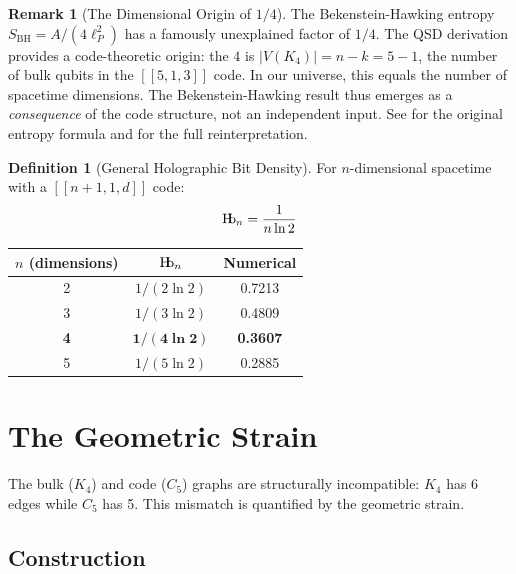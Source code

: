 \documentclass[11pt,a4paper]{article}
\theoremstyle{definition}
\newtheorem{definition}[theorem]{Definition}
\newtheorem{remark}[theorem]{Remark}
\newcommand{\Hb}{\textnormal{H\kern-0.3em b}}
\newcommand{\Hbn}{\Hb_n}
\begin{document}
\begin{remark}[The Dimensional Origin of $1/4$]
\label{S1:rem:quarter}
The Bekenstein-Hawking entropy $S_{\text{BH}} = A/(4\ell_P^2)$ has a famously unexplained factor of $1/4$. The QSD derivation provides a code-theoretic origin: the $4$ is $|V(K_4)| = n - k = 5 - 1$, the number of bulk qubits in the $[[5,1,3]]$ code. In our universe, this equals the number of spacetime dimensions. The Bekenstein-Hawking result thus emerges as a \emph{consequence} of the code structure, not an independent input. See \cite{Bekenstein1973,Hawking1975} for the original entropy formula and \cite{Hubka2026QSDsupp} for the full reinterpretation.
\end{remark}

\begin{definition}[General Holographic Bit Density]
\label{S1:def:hb_general}
For $n$-dimensional spacetime with a $[[n+1, 1, d]]$ code:
\begin{equation}
\Hbn = \frac{1}{n \ln 2}
\label{S1:eq:hb_general}
\end{equation}
\end{definition}

\begin{center}
\begin{tabular}{ccc}
\toprule
$n$ (dimensions) & $\Hbn$ & Numerical \\
\midrule
2 & $1/(2\ln 2)$ & 0.7213 \\
3 & $1/(3\ln 2)$ & 0.4809 \\
\textbf{4} & $\mathbf{1/(4\ln 2)}$ & \textbf{0.3607} \\
5 & $1/(5\ln 2)$ & 0.2885 \\
\bottomrule
\end{tabular}
\end{center}

\section{The Geometric Strain}
\label{sec:strain}

The bulk ($K_4$) and code ($C_5$) graphs are structurally incompatible: $K_4$ has 6 edges while $C_5$ has 5. This mismatch is quantified by the geometric strain.

\subsection{Construction}
\end{document}
